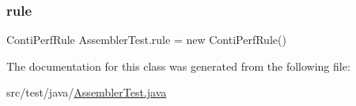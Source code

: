 \subsubsection{\texorpdfstring{rule}{rule}}
{\footnotesize\ttfamily Conti\+Perf\+Rule Assembler\+Test.\+rule = new Conti\+Perf\+Rule()}



The documentation for this class was generated from the following file\+:\begin{DoxyCompactItemize}
\item 
src/test/java/\mbox{\hyperlink{_assembler_test_8java}{Assembler\+Test.\+java}}\end{DoxyCompactItemize}
